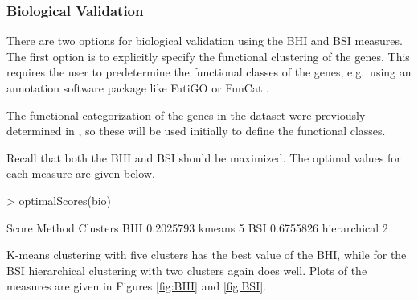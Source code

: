 \documentclass[11pt]{article}
\begin{document}
\subsubsection*{Biological Validation}


There are two options for biological validation using the BHI and BSI
measures.  The first option is to explicitly 
specify the functional clustering of the genes.  This requires the
user to predetermine the functional classes of the genes, e.g.~using
an annotation software package like FatiGO \citep{Al2004} or FunCat \citep{Rue2004}.



The functional categorization of the genes in the dataset  were previously determined in
\citet{Bha2007}, so these will be used initially to define the
functional classes.  

\begin{Schunk}
\end{Schunk}


Recall that both the BHI and BSI should be maximized.  The optimal values for each measure are given below.
\begin{Schunk}
\begin{Sinput}
> optimalScores(bio)
\end{Sinput}
\begin{Soutput}
        Score       Method Clusters
BHI 0.2025793       kmeans        5
BSI 0.6755826 hierarchical        2
\end{Soutput}
\end{Schunk}
K-means clustering with five clusters has the best value of the
BHI, while for the BSI hierarchical clustering with two clusters again
does well.  Plots of the measures are given in Figures \ref{fig:BHI} and \ref{fig:BSI}. 
\end{document}
